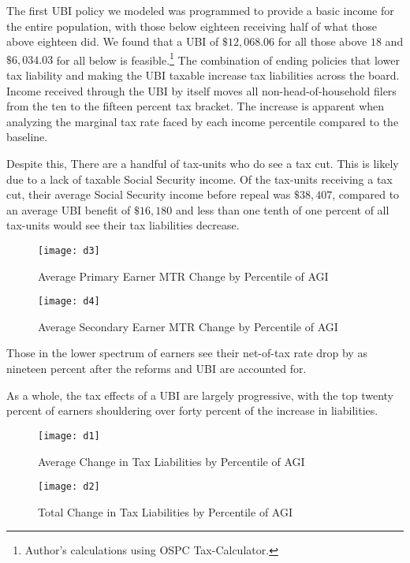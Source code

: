 \documentclass{article}
\begin{document}
The first UBI policy we modeled was programmed to provide a basic income for the entire population, with those below eighteen receiving half of what those above eighteen did. We found that a UBI of $\$12,068.06$ for all those above $18$ and $\$6,034.03$ for all below is feasible.\footnote{Author's calculations using OSPC Tax-Calculator.} The combination of ending policies that lower tax liability and making the UBI taxable increase tax liabilities across the board. Income received through the UBI by itself moves all non-head-of-household filers from the ten to the fifteen percent tax bracket. The increase is apparent when analyzing the marginal tax rate faced by each income percentile compared to the baseline.

Despite this, There are a handful of tax-units who do see a tax cut. This is likely due to a lack of taxable Social Security income. Of the tax-units receiving a tax cut, their average Social Security income before repeal was $\$38,407$, compared to an average UBI benefit of $\$16,180$ and less than one tenth of one percent of all tax-units would see their tax liabilities decrease.


\begin{figure}[H]
\centering
\caption{Average Primary Earner MTR Change by Percentile of AGI}
\texttt{[image: d3]}
\end{figure}

\begin{figure}[H]
\centering
\caption{Average Secondary Earner MTR Change by Percentile of AGI}
\texttt{[image: d4]}
\end{figure}

Those in the lower spectrum of earners see their net-of-tax rate drop by as nineteen percent after the reforms and UBI are accounted for.

As a whole, the tax effects of a UBI are largely progressive, with the top twenty percent of earners shouldering over forty percent of the increase in liabilities.

\begin{figure}[H]
\centering
\caption{Average Change in Tax Liabilities by Percentile of AGI}
\texttt{[image: d1]}
\end{figure}

\begin{figure}[H]
\centering
\caption{Total Change in Tax Liabilities by Percentile of AGI}
\texttt{[image: d2]}
\end{figure}
\end{document}
